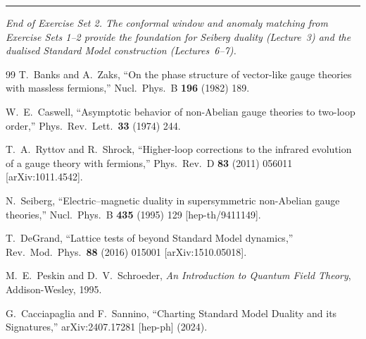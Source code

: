 \documentclass[11pt,a4paper]{article}
\begin{document}
\bigskip

\begin{center}
\rule{0.6\textwidth}{0.4pt}

\textit{End of Exercise Set 2.  The conformal window and anomaly matching
from Exercise Sets 1--2 provide the foundation for Seiberg duality
(Lecture~3) and the dualised Standard Model construction (Lectures~6--7).}
\end{center}

\begin{thebibliography}{99}
  T.~Banks and A.~Zaks, ``On the phase structure of vector-like gauge
  theories with massless fermions,'' Nucl.\ Phys.\ B \textbf{196} (1982) 189.

  W.~E.~Caswell, ``Asymptotic behavior of non-Abelian gauge theories to
  two-loop order,'' Phys.\ Rev.\ Lett.\ \textbf{33} (1974) 244.

  T.~A.~Ryttov and R.~Shrock, ``Higher-loop corrections to the infrared
  evolution of a gauge theory with fermions,'' Phys.\ Rev.\ D \textbf{83}
  (2011) 056011 [arXiv:1011.4542].

  N.~Seiberg, ``Electric--magnetic duality in supersymmetric non-Abelian
  gauge theories,'' Nucl.\ Phys.\ B \textbf{435} (1995) 129
  [hep-th/9411149].

  T.~DeGrand, ``Lattice tests of beyond Standard Model dynamics,''
  Rev.\ Mod.\ Phys.\ \textbf{88} (2016) 015001 [arXiv:1510.05018].

  M.~E.~Peskin and D.~V.~Schroeder, \textit{An Introduction to Quantum
  Field Theory}, Addison-Wesley, 1995.

  G.~Cacciapaglia and F.~Sannino, ``Charting Standard Model Duality and its
  Signatures,'' arXiv:2407.17281 [hep-ph] (2024).
\end{thebibliography}
\end{document}
